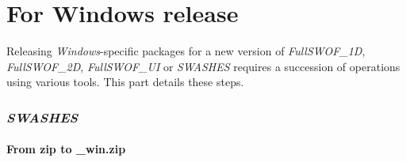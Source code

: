 \documentclass[a4paper, 11pt]{article}
\newcommand{\FullSWOFoneD}{\emph{FullSWOF\_1D}}
\newcommand{\FullSWOFtwoD}{\emph{FullSWOF\_2D}}
\newcommand{\FullSWOFUI}{\emph{FullSWOF\_UI}}
\newcommand{\SWASHES}{\emph{SWASHES}}
\begin{document}
\part{For Windows release}
\setcounter{section}{0}

Releasing \emph{Windows}-specific packages for a new version of \FullSWOFoneD, \FullSWOFtwoD{}, \FullSWOFUI{} or \SWASHES{} requires a succession of operations using various tools. 
This part details these steps.


\section{\SWASHES{}}

\subsection{From zip to \_win.zip}
\end{document}
